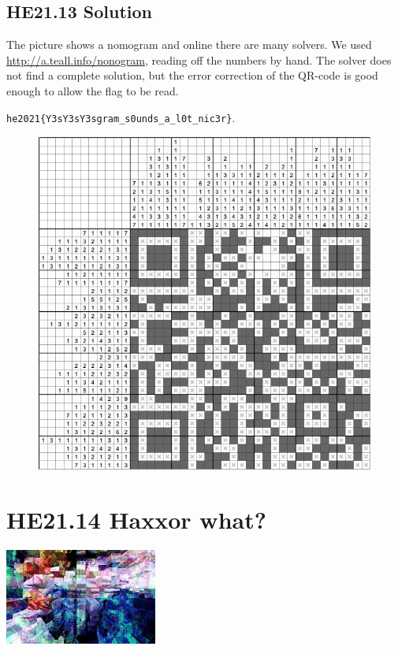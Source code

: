 \documentclass[english,a4paper,nols,noindent]{tufte-handout}
\begin{document}
\hypertarget{he21.13-solution}{%
\subsection{HE21.13 Solution}\label{he21.13-solution}}

\noindent The picture shows a nomogram and online there are many
solvers.  We used \url{http://a.teall.info/nonogram}, reading off the
numbers by hand.  The solver does not find a complete solution, but
the error correction of the QR-code is good enough to allow the flag
to be read.

\verb+he2021{Y3sY3sY3sgram_s0unds_a_l0t_nic3r}+.
\begin{figure}
    \includegraphics[width=150mm]{ch13/solution13.png}
\end{figure}

\hypertarget{he21.14}{%
  \section{HE21.14 Haxxor what?}
  \label{he21.14}}
\begin{marginfigure}
    \includegraphics[width=50mm]{images/challenge14.jpg}
\end{marginfigure}
\end{document}
